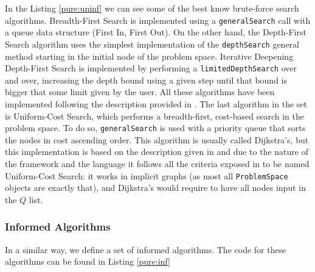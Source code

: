 In the Listing \ref{pure:uninf} we can see some of the best know brute-force
search algorithms. Breadth-First Search is implemented using a
\texttt{generalSearch} call with a queue data structure (First In, First Out).
On the other hand, the Depth-First Search algorithm uses the simplest
implementation of the \texttt{depthSearch} general method starting in the
initial node of the problem space. Iterative Deepening Depth-First Search is
implemented by performing a \texttt{limitedDepthSearch} over and over,
increasing the depth bound using a given step until that bound is bigger that
some limit given by the user. All these algorithms have been implemented
following the description provided in \cite{rusell-2003-aima}. The last
algorithm in the set is Uniform-Cost Search, which performs a breadth-first,
cost-based search in the problem space. To do so, \texttt{generalSearch} is
used with a priority queue that sorts the nodes in cost ascending order. This
algorithm is usually called Dijkstra's, but this implementation is based on the
description given in \cite{rusell-2003-aima} and due to the nature of the
framework and the language it follows all the criteria exposed in
\cite{felner-2011-dijkstra} to be named Uniform-Cost Search: it works in
implicit graphs (as most all \texttt{ProblemSpace} objects are exactly that),
and Dijkstra's would require to have all nodes input in the $Q$ list.\\


\subsubsection{Informed Algorithms}

In a similar way, we define a set of informed algorithms. The code for these
algorithms can be found in Listing \ref{pure:inf}


